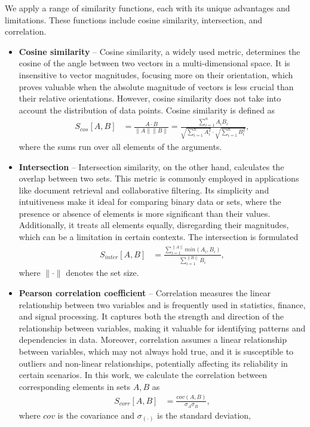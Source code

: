 We apply a range of similarity functions, each with its unique advantages and limitations. These functions include cosine similarity, intersection, and correlation.
\begin{itemize}
  \item \textbf{Cosine similarity} -- Cosine similarity, a widely used metric, determines the cosine of the angle
  between two vectors in a multi-dimensional space. It is insensitive to vector magnitudes, focusing more on their
  orientation, which proves valuable when the absolute magnitude of vectors is less crucial than their relative
  orientations. However, cosine similarity does not take into account the distribution of data points. Cosine
  similarity is defined as
  \begin{align}
    S_{cos} [A,B] &= \frac{A\cdot B}{\|A\|\|B\|} = \frac{\sum_{i=1}^nA_iB_i}{\sqrt{\sum_{i=1}^nA_i^2} \cdot \sqrt{\sum_{i
    =1}^n B_i^2}},
  \end{align}
  where the sums run over all elements of the arguments.
  \item \textbf{Intersection} -- Intersection similarity, on the other hand, calculates the overlap between two sets. This metric is commonly employed in applications like document retrieval and collaborative filtering. Its
  simplicity and intuitiveness make it ideal for comparing binary data or sets, where the presence or absence of
  elements is more significant than their values. Additionally, it treats all elements equally, disregarding their
  magnitudes, which can be a limitation in certain contexts. The intersection is formulated
    \begin{align}
      S_{inter}[A,B] &= \frac{\sum_{i=1}^{\|A\|} min(A_i, B_i) }{\sum_{i=1}^{\|B\|} B_i},
    \end{align}
    where $\|\cdot\|$ denotes the set size.
  \item \textbf{Pearson correlation coefficient} -- Correlation measures the linear relationship between two
  variables and is frequently used in statistics, finance, and signal processing. It captures both the strength and
  direction of the relationship between variables, making it valuable for identifying patterns and dependencies in
  data. Moreover, correlation assumes a linear relationship between variables, which may not always hold true, and it
  is susceptible to outliers and non-linear relationships, potentially  affecting its reliability in certain scenarios. In this work, we calculate the correlation between corresponding elements in sets $A, B$ as
    \begin{align}
      S_{corr}[A,B] &= \frac{cov(A,B)}{\sigma_A \sigma_B},
    \end{align}
    where $cov$ is the covariance and $\sigma_{(\cdot)}$ is the standard deviation,
\end{itemize}

